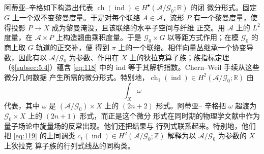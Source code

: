 \documentclass[11pt]{amsart}
\theoremstyle{definition}
\theoremstyle{remark}
\theoremstyle{plain}
\numberwithin{equation}{section}
\renewcommand{\:}{\colon}
\newcommand{\RR}{{\mathbb R}}
\DeclareMathOperator{\Tr}{Tr}
\newcommand{\ZZ}{{\mathbb Z}}
\DeclareMathOperator{\ch}{ch}
\DeclareMathOperator{\ind}{ind}
\newcommand{\sA}{\mathcal{A}}
\newcommand{\sG}{\mathscr{G}}
\begin{document}



阿蒂亚–辛格如下构造出代表 $\ch(\ind)\in H^{\bullet }(\sA/\sG_0;\RR)$ 的闭
微分形式。固定 $G$ 上一个双不变黎曼度量。于是对每个联络 $A\in \sA$，流形 $P$
有一个黎曼度量，使得投影 $P\to X$ 成为黎曼淹没，且该联络的水平子空间与纤维
正交。用 $\sA$ 上的 $L^2$ 度量，在 $\sA\times P$ 上构造翘曲乘积度量。于是
$\sG_0\times G$ 以等距方式作用；在模 $\sG_0$ 的商上取 $G$ 轨道的正交补，便
得到 $\pi $ 上的一个联络。相伴向量丛继承一个协变导数，因此有以 $\sA/\sG_0$
为参数、作用在 $X$ 上的狄拉克算子族；族指标定理（§\ref{subsec:5.4}）蕴含
\eqref{eq:118} 中的 ind 等于其解析指数。Chern–Weil 手续从这些微分几何数据
产生所需的微分形式。特别地，$\ch_1(\ind)\in H^2(\sA/\sG_0;\RR)$ 由
  \begin{equation}\label{eq:119}
     \int_{X}\omega 
  \end{equation}
代表，其中 $\omega $ 是 $(\sA/\sG_0)\times X$ 上的 $(2n+2)$ 形式。阿蒂亚–
辛格把 $\omega $ 超渡为 $\sG_0\times X$ 上的 $(2n+1)$ 形式，而正是这个微分
形式在同时期的物理学文献中作为量子场论中旋量场的反常出现。他们还把结果与
行列式联系起来。特别地，他们把 \eqref{eq:119} 的上同调类
$c_1(\ind)\in H^2(\sA/\sG_0;\ZZ)$ 解释为以 $\sA/\sG_0$ 为参数的 $X$ 上狄拉克
算子族的行列式线丛的同构类。

\end{document}
